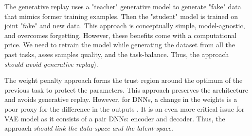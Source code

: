 The generative replay \citep{shin2017continual, rao2019continual} uses a "teacher" generative model to generate "fake" data that mimics former training examples. Then the "student" model is trained on joint "fake" and new data. This approach is conceptually simple, model-agnostic, and overcomes forgetting. However, these benefits come with a computational price. We need to retrain the model while generating the dataset from all the past tasks, asses samples quality, and the task-balance. Thus, the approach \textit{ should avoid generative replay}).

The weight penalty approach \citep{liu2018rotate, kirkpatrick2017overcoming} forms the trust region around the optimum of the previous task to protect the parameters. This approach preserves the architecture and avoids generative replay. However, for DNNs, a change in the weights is a poor proxy for the difference in the outputs \citep{benjamin2018measuring}. It is an even more critical issue for VAE model as it consists of a pair DNNs: encoder and decoder.  Thus, the approach \textit{should link the data-space and the latent-space}.

